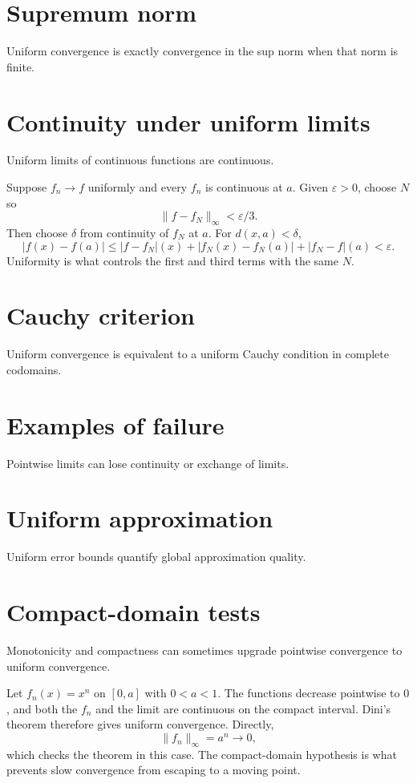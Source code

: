 \section{Supremum norm}
Uniform convergence is exactly convergence in the sup norm when that norm is finite.

\section{Continuity under uniform limits}
Uniform limits of continuous functions are continuous.


\begin{example}\label{ex:ii11-expand-02}
Suppose \(f_n\to f\) uniformly and every \(f_n\) is continuous at \(a\). Given
\(\varepsilon>0\), choose \(N\) so
\[
\|f-f_N\|_\infty<\varepsilon/3.
\]
Then choose \(\delta\) from continuity of \(f_N\) at \(a\). For
\(d(x,a)<\delta\),
\[
|f(x)-f(a)|
\le|f-f_N|(x)+|f_N(x)-f_N(a)|+|f_N-f|(a)
<\varepsilon.
\]
Uniformity is what controls the first and third terms with the same \(N\).
\end{example}
\section{Cauchy criterion}
Uniform convergence is equivalent to a uniform Cauchy condition in complete codomains.

\section{Examples of failure}
Pointwise limits can lose continuity or exchange of limits.

\section{Uniform approximation}
Uniform error bounds quantify global approximation quality.

\section{Compact-domain tests}
Monotonicity and compactness can sometimes upgrade pointwise convergence to uniform convergence.


\begin{example}\label{ex:ii11-expand-03}
Let \(f_n(x)=x^n\) on \([0,a]\) with \(0<a<1\). The functions decrease
pointwise to \(0\), and both the \(f_n\) and the limit are continuous on the
compact interval. Dini's theorem therefore gives uniform convergence.
Directly,
\[
\|f_n\|_\infty=a^n\to0,
\]
which checks the theorem in this case. The compact-domain hypothesis is what
prevents slow convergence from escaping to a moving point.
\end{example}
